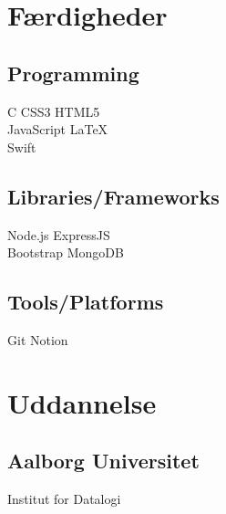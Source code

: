 \documentclass[]{plushcv}
\begin{document}
\begin{minipage}[t]{0.25\textwidth} 


\section{Færdigheder}
\subsection{Programming}
\sectionsep
{}
C \textbullet{} CSS3 \textbullet{} HTML5 \\
\sectionsep
{}
JavaScript \textbullet{} \LaTeX\ \\
\sectionsep
{}
Swift \\
\sectionsep
\sectionsep
\subsection{Libraries/Frameworks}
\sectionsep
Node.js \textbullet{} ExpressJS\\
\textbullet{} Bootstrap \textbullet{} MongoDB \\
\sectionsep
\sectionsep
\subsection{Tools/Platforms}
\sectionsep
Git \textbullet{} Notion\\

\sectionsep


\section{Uddannelse} 
\sectionsep
\subsection{Aalborg Universitet}
Institut for Datalogi \\
\sectionsep



\end{minipage}
\end{document}
